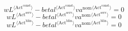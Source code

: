 \begin{equation}
{w} {{L}^{\langle \mathrm{Act}^{\mathrm{const}}\rangle}} - {{{b\!e\!t\!a\!l}}^{\langle \mathrm{\mathrm{Act}^{\mathrm{const}}}\rangle}} {{{v\!a}^{\mathrm{nom}}}^{\langle \mathrm{Act}^{\mathrm{const}}\rangle}} = 0
\end{equation}
\begin{equation}
{w} {{L}^{\langle \mathrm{Act}^{\mathrm{serv}}\rangle}} - {{{b\!e\!t\!a\!l}}^{\langle \mathrm{\mathrm{Act}^{\mathrm{serv}}}\rangle}} {{{v\!a}^{\mathrm{nom}}}^{\langle \mathrm{Act}^{\mathrm{serv}}\rangle}} = 0
\end{equation}
\begin{equation}
{w} {{L}^{\langle \mathrm{Act}^{\mathrm{Min}}\rangle}} - {{{b\!e\!t\!a\!l}}^{\langle \mathrm{\mathrm{Act}^{\mathrm{Min}}}\rangle}} {{{v\!a}^{\mathrm{nom}}}^{\langle \mathrm{Act}^{\mathrm{Min}}\rangle}} = 0
\end{equation}





